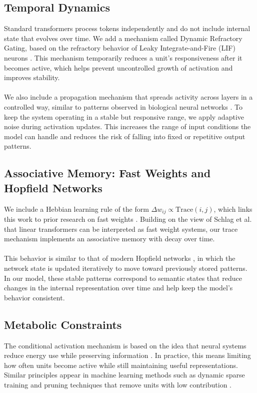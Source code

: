 \documentclass[11pt, letterpaper]{article}
\begin{document}
\subsection{Temporal Dynamics}
Standard transformers process tokens independently and do not include internal state that evolves over time. We add a mechanism called Dynamic Refractory Gating, based on the refractory behavior of Leaky Integrate-and-Fire (LIF) neurons \cite{lif_refractory}. This mechanism temporarily reduces a unit’s responsiveness after it becomes active, which helps prevent uncontrolled growth of activation and improves stability.

\paragraph{}
We also include a propagation mechanism that spreads activity across layers in a controlled way, similar to patterns observed in biological neural networks \cite{beggs_plenz,lac}. To keep the system operating in a stable but responsive range, we apply adaptive noise during activation updates. This increases the range of input conditions the model can handle and reduces the risk of falling into fixed or repetitive output patterns.

\subsection{Associative Memory: Fast Weights and Hopfield Networks}
We include a Hebbian learning rule of the form $\Delta w_{ij} \propto \text{Trace}(i,j)$, which links this work to prior research on fast weights \cite{fast_weights}. Building on the view of Schlag et al. \cite{linear_transformers} that linear transformers can be interpreted as fast weight systems, our trace mechanism implements an associative memory with decay over time.

\paragraph{}
This behavior is similar to that of modern Hopfield networks \cite{hopfield}, in which the network state is updated iteratively to move toward previously stored patterns. In our model, these stable patterns correspond to semantic states that reduce changes in the internal representation over time and help keep the model’s behavior consistent.

\subsection{Metabolic Constraints}
The conditional activation mechanism is based on the idea that neural systems reduce energy use while preserving information \cite{efficient_coding}. In practice, this means limiting how often units become active while still maintaining useful representations. Similar principles appear in machine learning methods such as dynamic sparse training and pruning techniques that remove units with low contribution \cite{demon_pruning}.
\end{document}
